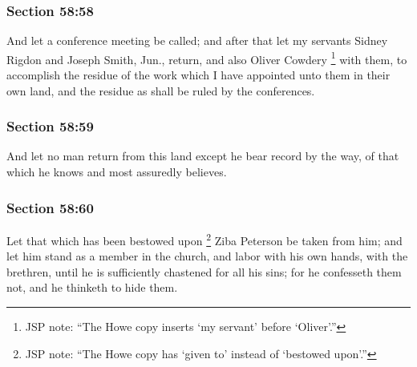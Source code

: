 	\subsubsection{Section 58:58} %
		\label{DC58-58}

		And let a conference meeting be called; and after that let my servants Sidney Rigdon and Joseph Smith, Jun., return, and also Oliver Cowdery%
			\footnote{%
				JSP note: ``The Howe copy inserts `my servant' before `Oliver'.''
				}
		with them, to accomplish the residue of the work which I have appointed unto them in their own land, and the residue as shall be ruled by the conferences.


	\subsubsection{Section 58:59} %
		\label{DC58-59}

		And let no man return from this land except he bear record by the way, of that which he knows and most assuredly believes.


	\subsubsection{Section 58:60} %
		\label{DC58-60}

		Let that which has been bestowed upon%
			\footnote{%
				JSP note: ``The Howe copy has `given to' instead of `bestowed upon'.''
				}
		Ziba Peterson be taken from him; and let him stand as a member in the church, and labor with his own hands, with the brethren, until he is sufficiently chastened for all his sins; for he confesseth them not, and he thinketh to hide them.

